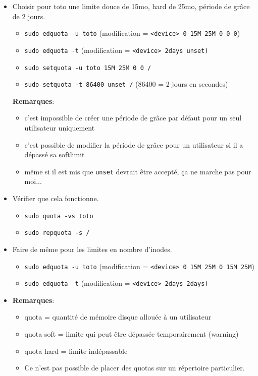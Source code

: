 \documentclass[a4paper]{article}
\begin{document}
\begin{itemize}
\item Choisir pour toto une limite douce de 15mo, hard de 25mo, période de grâce de 2 jours.
\begin{example}
    \begin{itemize}
        \item \texttt{sudo edquota -u toto} (modification = \texttt{<device> 0 15M 25M 0 0 0})
        \item \texttt{sudo edquota -t} (modification = \texttt{<device> 2days unset)}
        \item \texttt{sudo setquota -u toto 15M 25M 0 0 /}
        \item \texttt{sudo setquota -t 86400 unset /} (86400 = 2 jours en secondes)
    \end{itemize}
    \textbf{Remarques}:
    \begin{itemize}
        \item c'est impossible de créer une période de grâce par défaut pour un seul utilisateur uniquement
        \item c'est possible de modifier la période de grâce pour un utilisateur si il a dépassé sa softlimit
        \item même si il est mis que \texttt{unset} devrait être accepté, ça ne marche pas pour moi...
    \end{itemize}
\end{example}

\item Vérifier que cela fonctionne.
\begin{example}
    \begin{itemize}
        \item \texttt{sudo quota -vs toto}
        \item \texttt{sudo repquota -s /}
    \end{itemize}
\end{example}

\item Faire de même pour les limites en nombre d'inodes.
\begin{example}
    \begin{itemize}
        \item \texttt{sudo edquota -u toto} (modification = \texttt{<device> 0 15M 25M 0 15M 25M})
        \item \texttt{sudo edquota -t} (modification = \texttt{<device> 2days 2days)}
    \end{itemize}
\end{example}

\item \textbf{Remarques}:
\begin{itemize}
    \item quota = quantité de mémoire disque allouée à un utilisateur
    \item quota soft = limite qui peut être dépassée temporairement (warning)
    \item quota hard = limite indépassable
    \item Ce n'est pas possible de placer des quotas sur un répertoire particulier.
\end{itemize}

\end{itemize}
\end{document}
